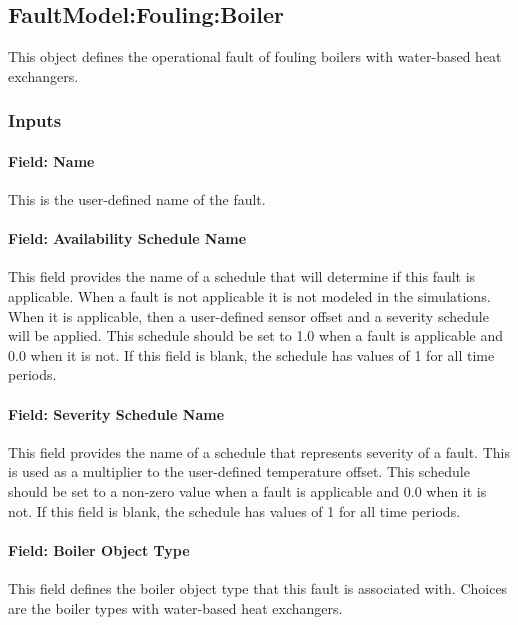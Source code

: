 \subsection{FaultModel:Fouling:Boiler}\label{faultmodelfoulingboiler}

This object defines the operational fault of fouling boilers with water-based heat exchangers.

\subsubsection{Inputs}

\paragraph{Field: Name}

This is the user-defined name of the fault.

\paragraph{Field: Availability Schedule Name}

This field provides the name of a schedule that will determine if this fault is applicable. When a fault is not applicable it is not modeled in the simulations. When it is applicable, then a user-defined sensor offset and a severity schedule will be applied. This schedule should be set to 1.0 when a fault is applicable and 0.0 when it is not. If this field is blank, the schedule has values of 1 for all time periods.

\paragraph{Field: Severity Schedule Name}\label{field-severity-schedule-name}

This field provides the name of a schedule that represents severity of a fault. This is used as a multiplier to the user-defined temperature offset. This schedule should be set to a non-zero value when a fault is applicable and 0.0 when it is not. If this field is blank, the schedule has values of 1 for all time periods.

\paragraph{Field: Boiler Object Type}\label{field-boiler-object-type}

This field defines the boiler object type that this fault is associated with. Choices are the boiler types with water-based heat exchangers.

